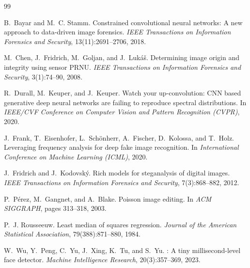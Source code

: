 \documentclass[10pt,twocolumn,letterpaper]{article}
\begin{document}
\begin{thebibliography}{99}
\small

B.~Bayar and M.~C. Stamm.
\newblock Constrained convolutional neural networks: A new approach to data-driven image forensics.
\newblock \emph{IEEE Transactions on Information Forensics and Security}, 13(11):2691--2706, 2018.

M.~Chen, J.~Fridrich, M.~Goljan, and J.~Luk{\'a}{\v{s}}.
\newblock Determining image origin and integrity using sensor {PRNU}.
\newblock \emph{IEEE Transactions on Information Forensics and Security}, 3(1):74--90, 2008.

R.~Durall, M.~Keuper, and J.~Keuper.
\newblock Watch your up-convolution: {CNN} based generative deep neural networks are failing to reproduce spectral distributions.
\newblock In \emph{IEEE/CVF Conference on Computer Vision and Pattern Recognition (CVPR)}, 2020.

J.~Frank, T.~Eisenhofer, L.~Sch{\"o}nherr, A.~Fischer, D.~Kolossa, and T.~Holz.
\newblock Leveraging frequency analysis for deep fake image recognition.
\newblock In \emph{International Conference on Machine Learning (ICML)}, 2020.

J.~Fridrich and J.~Kodovsk{\'y}.
\newblock Rich models for steganalysis of digital images.
\newblock \emph{IEEE Transactions on Information Forensics and Security}, 7(3):868--882, 2012.

P.~P{\'e}rez, M.~Gangnet, and A.~Blake.
\newblock Poisson image editing.
\newblock In \emph{ACM SIGGRAPH}, pages 313--318, 2003.

P.~J. Rousseeuw.
\newblock Least median of squares regression.
\newblock \emph{Journal of the American Statistical Association}, 79(388):871--880, 1984.

W.~Wu, Y.~Peng, C.~Yu, J.~Xing, K.~Tu, and S.~Yu.
: A tiny millisecond-level face detector.
\newblock \emph{Machine Intelligence Research}, 20(3):357--369, 2023.

\end{thebibliography}
\end{document}
